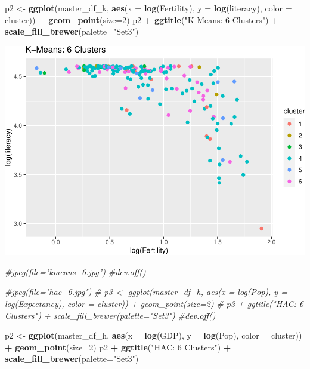 \documentclass[]{article}
\newenvironment{Shaded}{\begin{snugshade}}{\end{snugshade}}
\newcommand{\CommentTok}[1]{\textcolor[rgb]{0.56,0.35,0.01}{\textit{#1}}}
\newcommand{\DataTypeTok}[1]{\textcolor[rgb]{0.13,0.29,0.53}{#1}}
\newcommand{\DecValTok}[1]{\textcolor[rgb]{0.00,0.00,0.81}{#1}}
\newcommand{\KeywordTok}[1]{\textcolor[rgb]{0.13,0.29,0.53}{\textbf{#1}}}
\newcommand{\NormalTok}[1]{#1}
\newcommand{\OperatorTok}[1]{\textcolor[rgb]{0.81,0.36,0.00}{\textbf{#1}}}
\newcommand{\StringTok}[1]{\textcolor[rgb]{0.31,0.60,0.02}{#1}}
\begin{document}
\begin{Shaded}
\begin{Highlighting}[]
\NormalTok{p2 <-}\StringTok{ }\KeywordTok{ggplot}\NormalTok{(master_df_k, }\KeywordTok{aes}\NormalTok{(}\DataTypeTok{x =} \KeywordTok{log}\NormalTok{(Fertility), }\DataTypeTok{y =} \KeywordTok{log}\NormalTok{(literacy), }\DataTypeTok{color =}\NormalTok{ cluster)) }\OperatorTok{+}
\StringTok{  }\KeywordTok{geom_point}\NormalTok{(}\DataTypeTok{size=}\DecValTok{2}\NormalTok{)}
\NormalTok{p2 }\OperatorTok{+}\StringTok{ }\KeywordTok{ggtitle}\NormalTok{(}\StringTok{"K-Means: 6 Clusters"}\NormalTok{) }\OperatorTok{+}\StringTok{ }\KeywordTok{scale_fill_brewer}\NormalTok{(}\DataTypeTok{palette=}\StringTok{"Set3"}\NormalTok{)}
\end{Highlighting}
\end{Shaded}

\includegraphics{eda_files/figure-latex/unnamed-chunk-26-9.pdf}

\begin{Shaded}
\begin{Highlighting}[]
\CommentTok{#jpeg(file="kmeans_6.jpg")}
\CommentTok{#dev.off()}

\CommentTok{#jpeg(file="hac_6.jpg")}
\CommentTok{# p3 <- ggplot(master_df_h, aes(x = log(Pop), y = log(Expectancy), color = cluster)) + geom_point(size=2) }
\CommentTok{# p3 + ggtitle("HAC: 6 Clusters") + scale_fill_brewer(palette="Set3")}
\CommentTok{#dev.off()}
\end{Highlighting}
\end{Shaded}

\begin{Shaded}
\begin{Highlighting}[]
\NormalTok{p2 <-}\StringTok{ }\KeywordTok{ggplot}\NormalTok{(master_df_h, }\KeywordTok{aes}\NormalTok{(}\DataTypeTok{x =} \KeywordTok{log}\NormalTok{(GDP), }\DataTypeTok{y =} \KeywordTok{log}\NormalTok{(Pop), }\DataTypeTok{color =}\NormalTok{ cluster)) }\OperatorTok{+}
\StringTok{  }\KeywordTok{geom_point}\NormalTok{(}\DataTypeTok{size=}\DecValTok{2}\NormalTok{)}
\NormalTok{p2 }\OperatorTok{+}\StringTok{ }\KeywordTok{ggtitle}\NormalTok{(}\StringTok{"HAC: 6 Clusters"}\NormalTok{) }\OperatorTok{+}\StringTok{ }\KeywordTok{scale_fill_brewer}\NormalTok{(}\DataTypeTok{palette=}\StringTok{"Set3"}\NormalTok{)}
\end{Highlighting}
\end{Shaded}
\end{document}
